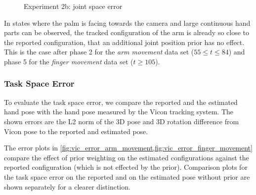 \begin{figure}[h]
\centering
{}
\caption{Experiment 2b: joint space error}
\label{fig:fm_joint_error}
\end{figure}

In states where the palm is facing towards the camera and large continuous hand parts can be observed, the tracked configuration of the arm is already so close to the reported configuration, that an additional joint position prior has no effect. This is the case after phase 2 for the \textit{arm movement} data set ($55\leq t \leq84$) and phase 5 for the \textit{finger movement} data set ($t \geq 105$).


\subsubsection{Task Space Error}

To evaluate the task space error, we compare the reported and the estimated hand pose with the hand pose measured by the Vicon tracking system. The shown errors are the L2 norm of the 3D pose and 3D rotation difference from Vicon pose to the reported and estimated pose.

The error plots in \cref{fig:vic_error_arm_movement,fig:vic_error_finger_movement} compare the effect of prior weighting on the estimated configurations against the reported configuration (which is not effected by the prior). Comparison plots for the task space error on the reported and on the estimated pose without prior are shown separately for a clearer distinction.

